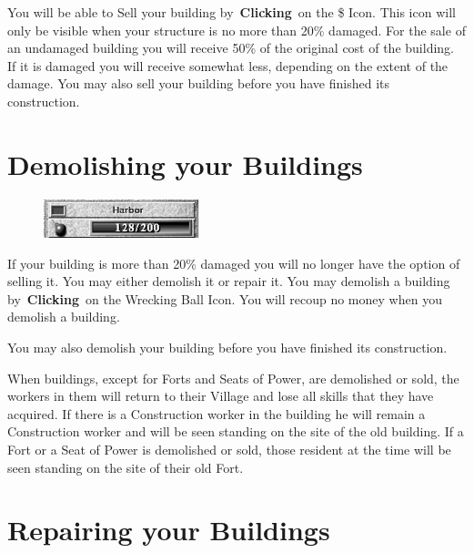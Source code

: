 You will be able to Sell your building by \textbf{Clicking} on the \$ Icon. This icon will only be visible when your structure is no more than 20\% damaged. For the sale of an undamaged building you will receive 50\% of the original cost of the building. If it is damaged you will receive somewhat less, depending on the extent of the damage. You may also sell your building before you have finished its construction.

\section{Demolishing your Buildings}

	
\begin{figure}
	\vspace{-20pt}
	\begin{center}
		\includegraphics[width=0.4\textwidth]{Idamage}
	\end{center}
	\vspace{-20pt}
\end{figure}

If your building is more than 20\% damaged you will no longer have the option of selling it. You may either demolish it or repair it. You may demolish a building by \textbf{Clicking} on the Wrecking Ball Icon. You will recoup no money when you demolish a building.

You may also demolish your building before you have finished its construction.

When buildings, except for Forts and Seats of Power, are demolished or sold, the workers in them will return to their Village and lose all skills that they have acquired. If there is a Construction worker in the building he will remain a Construction worker and will be seen standing on the site of the old building.
If a Fort or a Seat of Power is demolished or sold, those resident at the time will be seen standing on the site of their old Fort.

\section{Repairing your Buildings}

	
